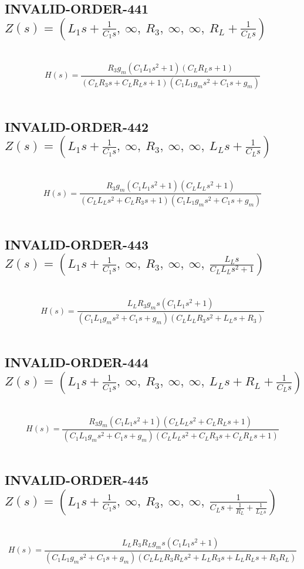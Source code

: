\documentclass{article}
\begin{document}
\subsection{INVALID-ORDER-441 $Z(s) = \left( L_{1} s + \frac{1}{C_{1} s}, \  \infty, \  R_{3}, \  \infty, \  \infty, \  R_{L} + \frac{1}{C_{L} s}\right)$ } \ 
\textbf{\[H(s) = \frac{R_{3} g_{m} \left(C_{1} L_{1} s^{2} + 1\right) \left(C_{L} R_{L} s + 1\right)}{\left(C_{L} R_{3} s + C_{L} R_{L} s + 1\right) \left(C_{1} L_{1} g_{m} s^{2} + C_{1} s + g_{m}\right)}\] } \ 
\subsection{INVALID-ORDER-442 $Z(s) = \left( L_{1} s + \frac{1}{C_{1} s}, \  \infty, \  R_{3}, \  \infty, \  \infty, \  L_{L} s + \frac{1}{C_{L} s}\right)$ } \ 
\textbf{\[H(s) = \frac{R_{3} g_{m} \left(C_{1} L_{1} s^{2} + 1\right) \left(C_{L} L_{L} s^{2} + 1\right)}{\left(C_{L} L_{L} s^{2} + C_{L} R_{3} s + 1\right) \left(C_{1} L_{1} g_{m} s^{2} + C_{1} s + g_{m}\right)}\] } \ 
\subsection{INVALID-ORDER-443 $Z(s) = \left( L_{1} s + \frac{1}{C_{1} s}, \  \infty, \  R_{3}, \  \infty, \  \infty, \  \frac{L_{L} s}{C_{L} L_{L} s^{2} + 1}\right)$ } \ 
\textbf{\[H(s) = \frac{L_{L} R_{3} g_{m} s \left(C_{1} L_{1} s^{2} + 1\right)}{\left(C_{1} L_{1} g_{m} s^{2} + C_{1} s + g_{m}\right) \left(C_{L} L_{L} R_{3} s^{2} + L_{L} s + R_{3}\right)}\] } \ 
\subsection{INVALID-ORDER-444 $Z(s) = \left( L_{1} s + \frac{1}{C_{1} s}, \  \infty, \  R_{3}, \  \infty, \  \infty, \  L_{L} s + R_{L} + \frac{1}{C_{L} s}\right)$ } \ 
\textbf{\[H(s) = \frac{R_{3} g_{m} \left(C_{1} L_{1} s^{2} + 1\right) \left(C_{L} L_{L} s^{2} + C_{L} R_{L} s + 1\right)}{\left(C_{1} L_{1} g_{m} s^{2} + C_{1} s + g_{m}\right) \left(C_{L} L_{L} s^{2} + C_{L} R_{3} s + C_{L} R_{L} s + 1\right)}\] } \ 
\subsection{INVALID-ORDER-445 $Z(s) = \left( L_{1} s + \frac{1}{C_{1} s}, \  \infty, \  R_{3}, \  \infty, \  \infty, \  \frac{1}{C_{L} s + \frac{1}{R_{L}} + \frac{1}{L_{L} s}}\right)$ } \ 
\textbf{\[H(s) = \frac{L_{L} R_{3} R_{L} g_{m} s \left(C_{1} L_{1} s^{2} + 1\right)}{\left(C_{1} L_{1} g_{m} s^{2} + C_{1} s + g_{m}\right) \left(C_{L} L_{L} R_{3} R_{L} s^{2} + L_{L} R_{3} s + L_{L} R_{L} s + R_{3} R_{L}\right)}\] } \ 
\end{document}
